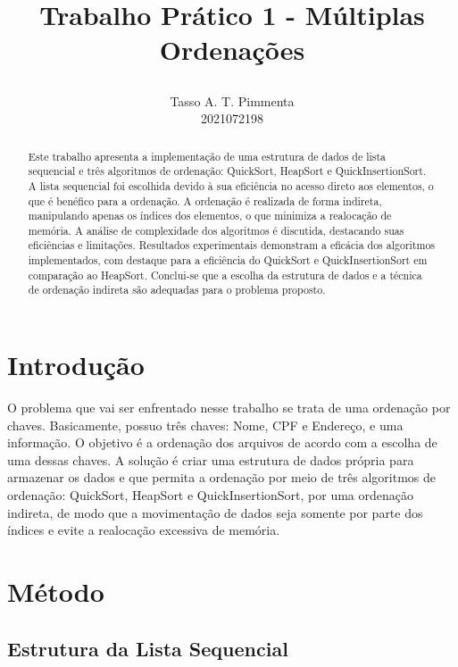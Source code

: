 \documentclass[a4paper,12pt]{article}
\title{
    \begin{center}
    \textbf{\fontsize{12}{14} \selectfont Trabalho Prático 1 - Múltiplas Ordenações}
    \end{center}
}
\author{Tasso A. T. Pimmenta \\ 2021072198}
\begin{document}
\maketitle

\tableofcontents

\begin{abstract}
    Este trabalho apresenta a implementação de uma estrutura de dados de lista sequencial e três algoritmos de ordenação: QuickSort, HeapSort e QuickInsertionSort. 
    A lista sequencial foi escolhida devido à sua eficiência no acesso direto aos elementos, o que é benéfico para a ordenação. A ordenação é realizada de forma indireta, 
    manipulando apenas os índices dos elementos, o que minimiza a realocação de memória. A análise de complexidade dos algoritmos é discutida, destacando suas eficiências e limitações. 
    Resultados experimentais demonstram a eficácia dos algoritmos implementados, com destaque para a eficiência do QuickSort e QuickInsertionSort em comparação ao HeapSort. 
    Conclui-se que a escolha da estrutura de dados e a técnica de ordenação indireta são adequadas para o problema proposto.
\end{abstract}

\newpage

\section{Introdução}
\hspace*{1cm}

O problema que vai ser enfrentado nesse trabalho se trata de uma ordenação por chaves. Basicamente, possuo três chaves: 
Nome, CPF e Endereço, e uma informação. O objetivo é a ordenação dos arquivos
de acordo com a escolha de uma dessas chaves. A solução é criar uma estrutura de dados própria para armazenar 
os dados e que permita a ordenação por meio de três algoritmos de ordenação: QuickSort, HeapSort e QuickInsertionSort,
por uma ordenação indireta, de modo que a movimentação de dados seja somente por parte dos índices e evite a realocação excessiva de memória.

\section{Método}

\subsection{Estrutura da Lista Sequencial}
\hspace*{1cm}
\end{document}

